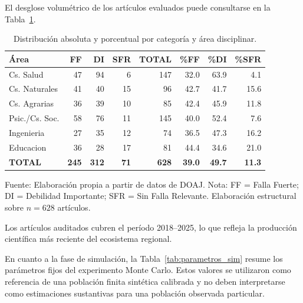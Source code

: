 El desglose volumétrico de los artículos evaluados puede consultarse en la Tabla~\ref{tab:distribucion_area}.

\begin{table}[H]
\centering
\caption{Distribución absoluta y porcentual por categoría y área disciplinar.}
\label{tab:distribucion_area}
\begin{tabular}{lrrrrrrr}
\toprule
\textbf{Área} & \textbf{FF} & \textbf{DI} & \textbf{SFR} & \textbf{TOTAL} & \textbf{\%FF} & \textbf{\%DI} & \textbf{\%SFR} \\
\midrule
Cs. Salud & 47 & 94 & 6 & 147 & 32.0 & 63.9 & 4.1 \\
Cs. Naturales & 41 & 40 & 15 & 96 & 42.7 & 41.7 & 15.6 \\
Cs. Agrarias & 36 & 39 & 10 & 85 & 42.4 & 45.9 & 11.8 \\
Psic./Cs. Soc. & 58 & 76 & 11 & 145 & 40.0 & 52.4 & 7.6 \\
Ingenieria & 27 & 35 & 12 & 74 & 36.5 & 47.3 & 16.2 \\
Educacion & 36 & 28 & 17 & 81 & 44.4 & 34.6 & 21.0 \\
\textbf{TOTAL} & \textbf{245} & \textbf{312} & \textbf{71} & \textbf{628} & \textbf{39.0} & \textbf{49.7} & \textbf{11.3} \\
\bottomrule
\end{tabular}
\begin{flushleft}
\footnotesize Fuente: Elaboración propia a partir de datos de DOAJ. Nota: FF = Falla Fuerte; DI = Debilidad Importante; SFR = Sin Falla Relevante. Elaboración estructural sobre $n=628$ artículos.
\end{flushleft}
\end{table}

Los artículos auditados cubren el período 2018--2025, lo que refleja la producción científica más reciente del ecosistema regional.

En cuanto a la fase de simulación, la Tabla~\ref{tab:parametros_sim} resume los parámetros fijos del experimento Monte Carlo. Estos valores se utilizaron como referencia de una población finita sintética calibrada y no deben interpretarse como estimaciones sustantivas para una población observada particular.

